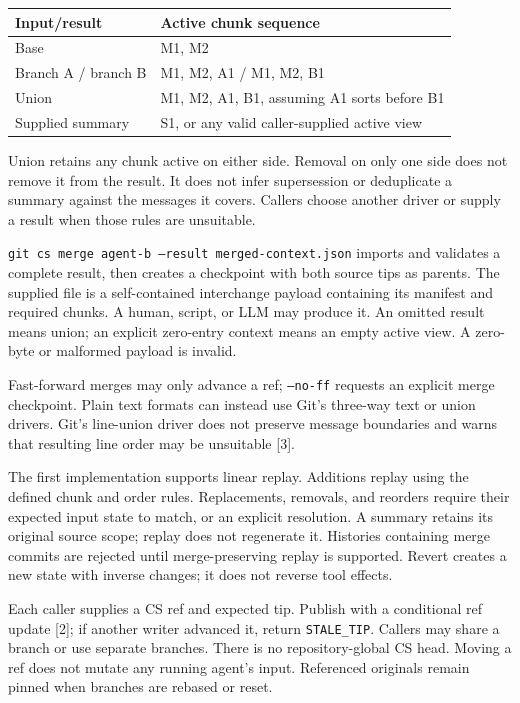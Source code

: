 \documentclass[11pt,letterpaper]{article}
\newcommand{\subsect}[1]{\vspace{3pt}{\bfseries\textcolor{ink}{#1}}\par}
\newcommand{\code}[1]{{\small\texttt{#1}}}
\begin{document}
\begin{tabularx}{\linewidth}{p{1.45in}Y}
\toprule
\textbf{Input/result} & \textbf{Active chunk sequence}\\
\midrule
Base & M1, M2\\
Branch A / branch B & M1, M2, A1 \quad / \quad M1, M2, B1\\
Union & M1, M2, A1, B1, assuming A1 sorts before B1\\
Supplied summary & S1, or any valid caller-supplied active view\\
\bottomrule
\end{tabularx}

Union retains any chunk active on either side. Removal on only one side does
not remove it from the result. It does not infer supersession or deduplicate
a summary against the messages it covers. Callers choose another driver or
supply a result when those rules are unsuitable.

\subsect{Supplied results and text drivers}
\code{git cs merge agent-b --result merged-context.json} imports and validates
a complete result, then creates a checkpoint with both source tips as parents.
The supplied file is a self-contained interchange payload containing its
manifest and required chunks. A human, script, or LLM may produce it.
An omitted result means union; an explicit zero-entry context means an empty
active view. A zero-byte or malformed payload is invalid.

Fast-forward merges may only advance a ref; \code{--no-ff} requests an explicit
merge checkpoint. Plain text formats can instead use Git's three-way text or
union drivers. Git's line-union driver does not preserve message boundaries
and warns that resulting line order may be unsuitable [3].

\subsect{Rebase and cherry-pick replay data}
The first implementation supports linear replay. Additions replay using the
defined chunk and order rules. Replacements, removals, and reorders require
their expected input state to match, or an explicit resolution. A summary
retains its original source scope; replay does not regenerate it. Histories
containing merge commits are rejected until merge-preserving replay is supported.
Revert creates a new state with inverse changes; it does not reverse tool effects.

\subsect{Concurrent updates}
Each caller supplies a CS ref and expected tip. Publish with a conditional
ref update [2]; if another writer advanced it, return \code{STALE\_TIP}.
Callers may share a branch or use separate branches. There is no
repository-global CS head. Moving a ref does not mutate any running agent's input.
Referenced originals remain pinned when branches are rebased or reset.
\end{document}
